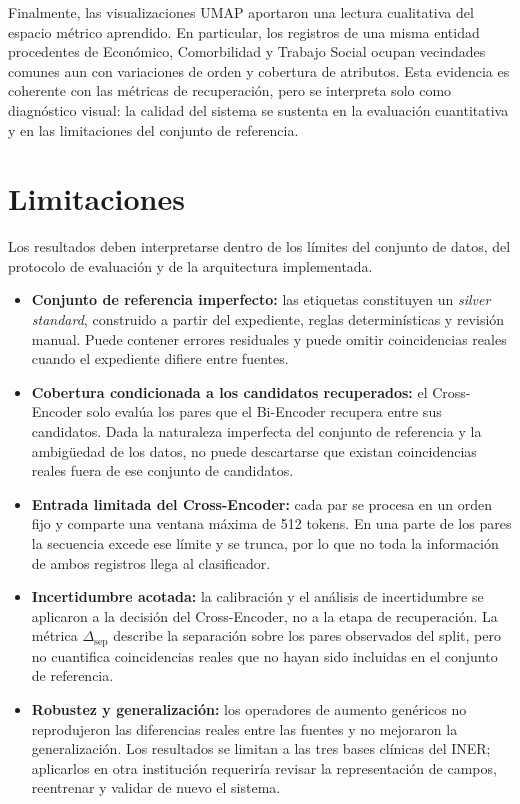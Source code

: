 Finalmente, las visualizaciones UMAP aportaron una lectura cualitativa del espacio métrico aprendido. En particular, los registros de una misma entidad procedentes de Económico, Comorbilidad y Trabajo Social ocupan vecindades comunes aun con variaciones de orden y cobertura de atributos. Esta evidencia es coherente con las métricas de recuperación, pero se interpreta solo como diagnóstico visual: la calidad del sistema se sustenta en la evaluación cuantitativa y en las limitaciones del conjunto de referencia.


\section{Limitaciones}

Los resultados deben interpretarse dentro de los límites del conjunto de datos, del protocolo de evaluación y de la arquitectura implementada.
\begin{itemize}
    \item \textbf{Conjunto de referencia imperfecto:} las etiquetas constituyen un \textit{silver standard}, construido a partir del expediente, reglas determinísticas y revisión manual. Puede contener errores residuales y puede omitir coincidencias reales cuando el expediente difiere entre fuentes.
    \item \textbf{Cobertura condicionada a los candidatos recuperados:} el Cross-Encoder solo evalúa los pares que el Bi-Encoder recupera entre sus candidatos. Dada la naturaleza imperfecta del conjunto de referencia y la ambigüedad de los datos, no puede descartarse que existan coincidencias reales fuera de ese conjunto de candidatos.
    \item \textbf{Entrada limitada del Cross-Encoder:} cada par se procesa en un orden fijo y comparte una ventana máxima de 512 tokens. En una parte de los pares la secuencia excede ese límite y se trunca, por lo que no toda la información de ambos registros llega al clasificador.
    \item \textbf{Incertidumbre acotada:} la calibración y el análisis de incertidumbre se aplicaron a la decisión del Cross-Encoder, no a la etapa de recuperación. La métrica $\Delta_{\mathrm{sep}}$ describe la separación sobre los pares observados del split, pero no cuantifica coincidencias reales que no hayan sido incluidas en el conjunto de referencia.
    \item \textbf{Robustez y generalización:} los operadores de aumento genéricos no reprodujeron las diferencias reales entre las fuentes y no mejoraron la generalización. Los resultados se limitan a las tres bases clínicas del INER; aplicarlos en otra institución requeriría revisar la representación de campos, reentrenar y validar de nuevo el sistema.
\end{itemize}


